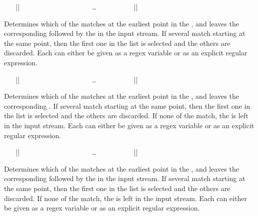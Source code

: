 \documentclass[oneside]{book}
\begin{document}
\begin{function}{\RegexMatchCaseT}
\begin{syntax}
~ ~ |{|
~ ~ ~ ~  
~ ~ ~ ~  
~ ~ ~ ~ \ldots
~ ~ ~ ~  
~ ~ |}| 
~ ~ 
\end{syntax}
Determines which of the  matches at the
earliest point in the , and leaves the
corresponding  followed by the  in the
input stream. If several  match starting at the same
point, then the first one in the list is selected and the others are
discarded. Each  can either be given
as a regex variable or as an explicit regular expression.
\end{function}

\begin{function}{\RegexMatchCaseF}
\begin{syntax}
~ ~ |{|
~ ~ ~ ~  
~ ~ ~ ~  
~ ~ ~ ~ \ldots
~ ~ ~ ~  
~ ~ |}| 
~ ~ 
\end{syntax}
Determines which of the  matches at the
earliest point in the , and leaves the
corresponding .
If several  match starting at the same
point, then the first one in the list is selected and the others are
discarded.  If none of the  match, the 
is left in the input stream.  Each  can either be given
as a regex variable or as an explicit regular expression.
\end{function}

\begin{function}{\RegexMatchCaseTF}
\begin{syntax}
~ ~ |{|
~ ~ ~ ~  
~ ~ ~ ~  
~ ~ ~ ~ \ldots
~ ~ ~ ~  
~ ~ |}| 
~ ~  
\end{syntax}
Determines which of the  matches at the
earliest point in the , and leaves the
corresponding  followed by the  in the
input stream.  If several  match starting at the same
point, then the first one in the list is selected and the others are
discarded.  If none of the  match, the 
is left in the input stream.  Each  can either be given
as a regex variable or as an explicit regular expression.
\end{function}
\end{document}
